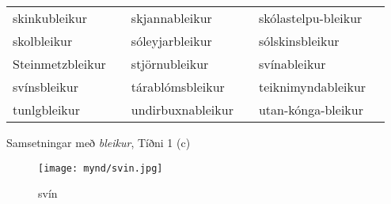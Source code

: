 \documentclass[../samsetningasafn.tex]{subfiles}
\begin{document}
\begin{wordlist}[H]
\begin{tcolorbox}

	\setlength{\extrarowheight}{3pt}
	\begin{tabular}{BlBlBl}			
		skinkubleikur		&		& 
		skjannableikur	&		& 
		skólastelpu-bleikur	&	\\ 
		skolbleikur		&		& 
		sóleyjarbleikur	&		& 
		sólskinsbleikur	&		\\ 
		Steinmetzbleikur	&		& 
		stjörnubleikur	&		& 
		svínableikur		&		\\ 
		svínsbleikur		&		& 
		tárablómsbleikur	&		& 
		teiknimyndableikur &		\\ 
		tunlgbleikur		&		& 
		undirbuxnableikur &		& 
		utan-kónga-bleikur &			
\end{tabular}

\end{tcolorbox}
	\caption{Samsetningar með \textit{bleikur}, Tíðni 1 (c)}
	\label{listi:bleikt.1c}
\end{wordlist}	

\begin{figure}[H]
\begin{tcolorbox}
\centering
	\texttt{[image: mynd/svin.jpg]}
\end{tcolorbox}
	\caption{svín}
	\label{mynd:svin}
\end{figure}		
\end{document}
